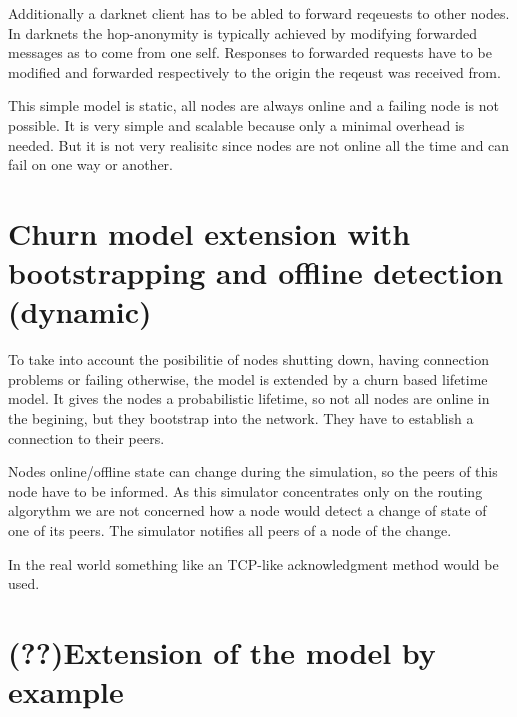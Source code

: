 Additionally a darknet client has to be abled to forward reqeuests to other nodes. In darknets the hop-anonymity is typically achieved by modifying forwarded messages as to come from one self. Responses to forwarded requests have to be modified and forwarded respectively to the origin the reqeust was received from.

This simple model is static, all nodes are always online and a failing node is not possible. It is very simple and scalable because only a minimal overhead is needed. But it is not very realisitc since nodes are not online all the time and can fail on one way or another.


\section{Churn model extension with bootstrapping and offline detection (dynamic)}

To take into account the posibilitie of nodes shutting down, having connection problems or failing otherwise, the model is extended by a churn based lifetime model. It gives the nodes a probabilistic lifetime, so not all nodes are online in the begining, but they bootstrap into the network. They have to establish a connection to their peers.

Nodes online/offline state can change during the simulation, so the peers of this node have to be informed. As this simulator concentrates only on the routing algorythm we are not concerned how a node would detect a change of state of one of its peers. The simulator notifies all peers of a node of the change. 

In the real world something like an TCP-like acknowledgment method would be used.

\section{ (??)Extension of the model by example}
